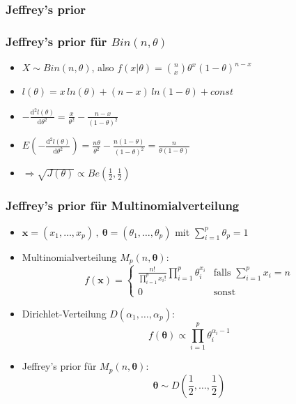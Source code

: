 \documentclass[aspectratio=169,xcolor=dvipsnames]{beamer}
\newtheorem{satz}{Satz}
\begin{document}
\begin{frame}
\frametitle{Jeffrey's prior}
\end{frame}

\begin{frame}
\frametitle{Jeffrey's prior für $Bin(n,\theta)$}
\begin{itemize}
\item<1-> $X\sim Bin(n,\theta)$, also $f(x|\theta)= \binom{n}{x}\theta^x(1-\theta)^{n-x}$
\item<2-> $l(\theta)=x\,ln(\theta)+(n-x)\,ln(1-\theta)+const$
\item<3-> $-\frac{\text{d}^2l(\theta)}{\text{d}\theta^2}=\frac{x}{\theta^2}-\frac{n-x}{(1-\theta)^2}$ 
\item<4-> $E(-\frac{\text{d}^2l(\theta)}{\text{d}\theta^2}) = \frac{n\theta}{\theta^2}-\frac{n(1-\theta)}{(1-\theta)^2}=\frac{n}{\theta(1-\theta)}$
\item<5-> $\Rightarrow \sqrt{J(\theta)}\propto Be(\frac{1}{2},\frac{1}{2})$
\end{itemize}
\end{frame}

\begin{frame}
\frametitle{Jeffrey's prior für Multinomialverteilung}
\begin{itemize}
\item<1-> $\boldsymbol{x}=(x_1,\dots,x_p)\,,~\boldsymbol{\theta}=(\theta_1,\dots,\theta_p)$ mit $\sum_{i=1}^p\theta_p = 1$
\item<2-> Multinomialverteilung $M_p(n,\boldsymbol{\theta})$: $$f(\boldsymbol{x})=\left\{\begin{array}{ll}
\frac{n!}{\prod_{i=1}^{p}x_i!}\prod_{i=1}^{p}\theta_i^{x_i} & \text{falls }\sum_{i=1}^{p}x_i=n\\
0 & \text{sonst}
\end{array}\right.$$
\item<3-> Dirichlet-Verteilung $D(\alpha_1,\dots,\alpha_p)$: $$f(\boldsymbol{\theta})\propto\prod_{i=1}^{p}\theta_i^{\alpha_i-1}$$
\item<4-> Jeffrey's prior für $M_p(n,\boldsymbol{\theta})$:
$$\boldsymbol{\theta}\sim D\left(\frac{1}{2},\dots,\frac{1}{2}\right)$$
\end{itemize}
\end{frame}
\end{document}
